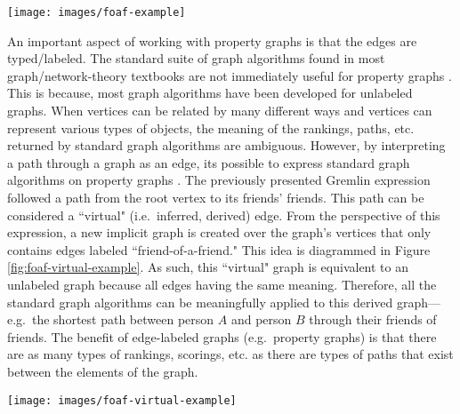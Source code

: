 \documentclass{svmult}
\begin{document}
\begin{figure*}[h!]
	\centering
		\texttt{[image: images/foaf-example]}
	\caption{\label{fig:foaf-example}a.) The grey vertices denote the friends of the friends of the root vertex. b.) The grey vertices denote the friends of the friends of the root vertex who are not also the friends of the root vertex. For the sake of diagram clarity, the edges are not labeled. Assume that all edges are labeled ``friend."}
\end{figure*}

An important aspect of working with property graphs is that the edges are typed/labeled. The standard suite of graph algorithms found in most graph/network-theory textbooks are not immediately useful for property graphs \cite{netanal:brandes2005}. This is because, most graph algorithms have been developed for unlabeled graphs. When vertices can be related by many different ways and vertices can represent various types of objects, the meaning of the rankings, paths, etc. returned by standard graph algorithms are ambiguous. However, by interpreting a path through a graph as an edge, its possible to express standard graph algorithms on property graphs \cite{pathalg:rodriguez2009}. The previously presented Gremlin expression followed a path from the root vertex to its friends' friends. This path can be considered a ``virtual" (i.e.~inferred, derived) edge. From the perspective of this expression, a new implicit graph is created over the graph's vertices that only contains edges labeled ``friend-of-a-friend." This idea is diagrammed in Figure \ref{fig:foaf-virtual-example}. As such, this ``virtual" graph is equivalent to an unlabeled graph because all edges having the same meaning. Therefore, all the standard graph algorithms can be meaningfully applied to this derived graph---e.g.~the shortest path between person $A$ and person $B$ through their friends of friends. The benefit of edge-labeled graphs (e.g.~property graphs) is that there are as many types of rankings, scorings, etc. as there are types of paths that exist between the elements of the graph.
\begin{figure*}[h!]
	\centering
		\texttt{[image: images/foaf-virtual-example]}
	\caption{\label{fig:foaf-virtual-example}The evaluation of the friend-of-a-friend expression yields a path from the root vertex to the vertex's friends' friends. This path can be interpreted as a virtual/inferred/implicit/derived edge. For the sake of diagram clarity, no edges are labeled. Assume that all edges are labeled ``friend-of-a-friend."}
\end{figure*}
\end{document}
